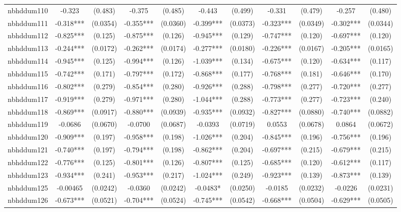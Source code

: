 \documentclass[]{article}
\begin{document}
\begin{tabular}{lcccccccccc}
nbhddum110 & -0.323 & (0.483) & -0.375 & (0.485) & -0.443 & (0.499) & -0.331 & (0.479) & -0.257 & (0.480) \\
nbhddum111 & -0.318*** & (0.0354) & -0.355*** & (0.0360) & -0.399*** & (0.0373) & -0.323*** & (0.0349) & -0.302*** & (0.0344) \\
nbhddum112 & -0.825*** & (0.125) & -0.875*** & (0.126) & -0.945*** & (0.129) & -0.747*** & (0.120) & -0.697*** & (0.120) \\
nbhddum113 & -0.244*** & (0.0172) & -0.262*** & (0.0174) & -0.277*** & (0.0180) & -0.226*** & (0.0167) & -0.205*** & (0.0165) \\
nbhddum114 & -0.945*** & (0.125) & -0.994*** & (0.126) & -1.039*** & (0.134) & -0.675*** & (0.120) & -0.634*** & (0.117) \\
nbhddum115 & -0.742*** & (0.171) & -0.797*** & (0.172) & -0.868*** & (0.177) & -0.768*** & (0.181) & -0.646*** & (0.170) \\
nbhddum116 & -0.802*** & (0.279) & -0.854*** & (0.280) & -0.926*** & (0.288) & -0.798*** & (0.277) & -0.720*** & (0.277) \\
nbhddum117 & -0.919*** & (0.279) & -0.971*** & (0.280) & -1.044*** & (0.288) & -0.773*** & (0.277) & -0.723*** & (0.240) \\
nbhddum118 & -0.869*** & (0.0917) & -0.880*** & (0.0939) & -0.935*** & (0.0932) & -0.827*** & (0.0880) & -0.740*** & (0.0882) \\
nbhddum119 & -0.0686 & (0.0670) & -0.0700 & (0.0687) & -0.0393 & (0.0719) & 0.0553 & (0.0678) & 0.0864 & (0.0672) \\
nbhddum120 & -0.909*** & (0.197) & -0.958*** & (0.198) & -1.026*** & (0.204) & -0.845*** & (0.196) & -0.756*** & (0.196) \\
nbhddum121 & -0.740*** & (0.197) & -0.794*** & (0.198) & -0.862*** & (0.204) & -0.697*** & (0.215) & -0.679*** & (0.215) \\
nbhddum122 & -0.776*** & (0.125) & -0.801*** & (0.126) & -0.807*** & (0.125) & -0.685*** & (0.120) & -0.612*** & (0.117) \\
nbhddum123 & -0.934*** & (0.241) & -0.953*** & (0.217) & -1.024*** & (0.249) & -0.923*** & (0.139) & -0.873*** & (0.139) \\
nbhddum125 & -0.00465 & (0.0242) & -0.0360 & (0.0242) & -0.0483* & (0.0250) & -0.0185 & (0.0232) & -0.0226 & (0.0231) \\
nbhddum126 & -0.673*** & (0.0521) & -0.704*** & (0.0524) & -0.745*** & (0.0542) & -0.668*** & (0.0504) & -0.629*** & (0.0505) \\

\end{tabular}
\end{document}
